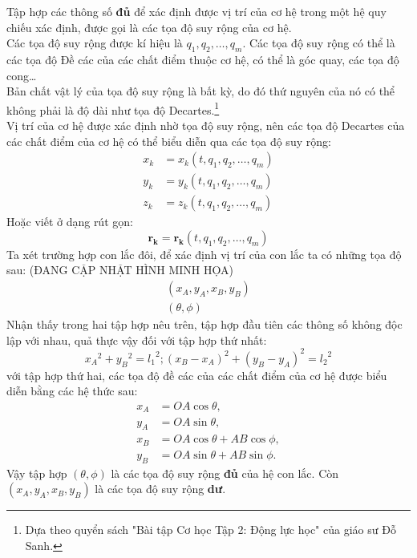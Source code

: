 Tập hợp các thông số \textbf{đủ} để xác định được vị trí của cơ hệ trong một hệ quy chiếu xác định, được gọi là các tọa độ suy rộng của cơ hệ.\\
Các tọa độ suy rộng được kí hiệu là $q_1, q_2, \ldots, q_m$. Các tọa độ suy rộng có thể là các tọa độ Đề các của các chất điểm thuộc cơ hệ, có thể là góc quay, các tọa độ cong\ldots\\
Bản chất vật lý của tọa độ suy rộng là bất kỳ, do đó thứ nguyên của nó có thể không phải là độ dài như tọa độ Decartes.\footnote{Dựa theo quyển sách "Bài tập Cơ học Tập 2: Động lực học" của giáo sư Đỗ Sanh.}\\
Vị trí của cơ hệ được xác định nhờ tọa độ suy rộng, nên các tọa độ Decartes của các chất điểm của cơ hệ có thể biểu diễn qua các tọa độ suy rộng:
\begin{align*}
    x_k &= x_k(t, q_1, q_2, \ldots, q_m)\\
    y_k &= y_k(t, q_1, q_2, \ldots, q_m)\\
    z_k &= z_k(t, q_1, q_2, \ldots, q_m)
\end{align*}
Hoặc viết ở dạng rút gọn:
\begin{equation*}
    \mathbf{r_k} = \mathbf{r_k}(t, q_1, q_2, \ldots, q_m)
\end{equation*}
Ta xét trường hợp con lắc đôi, để xác định vị trí của con lắc ta có những tọa độ sau: (ĐANG CẬP NHẬT HÌNH MINH HỌA)
\begin{align*}
    (x_A, y_A, x_B, y_B)\\
    (\theta, \phi)
\end{align*}
Nhận thấy trong hai tập hợp nêu trên, tập hợp đầu tiên các thông số không độc lập với nhau, quả thực vậy đối với tập hợp thứ nhất:
\begin{equation*}
    {x_A}^2+{y_B}^2 = {l_1}^2; {(x_B - x_A)}^2+{(y_B - y_A)}^2 = {l_2}^2
\end{equation*}
với tập hợp thứ hai, các tọa độ đề các của các chất điểm của cơ hệ được biểu diễn bằng các hệ thức sau:
\begin{align*}
    x_A &= OA\cos{\theta}, \\
    y_A &= OA\sin{\theta}, \\
    x_B &= OA\cos{\theta} + AB\cos{\phi}, \\
    y_B &= OA\sin{\theta} + AB\sin{\phi}.
\end{align*}
Vậy tập hợp $(\theta, \phi)$ là các tọa độ suy rộng \textbf{đủ} của hệ con lắc. Còn $(x_A, y_A, x_B, y_B)$ là các tọa độ suy rộng \textbf{dư}.

